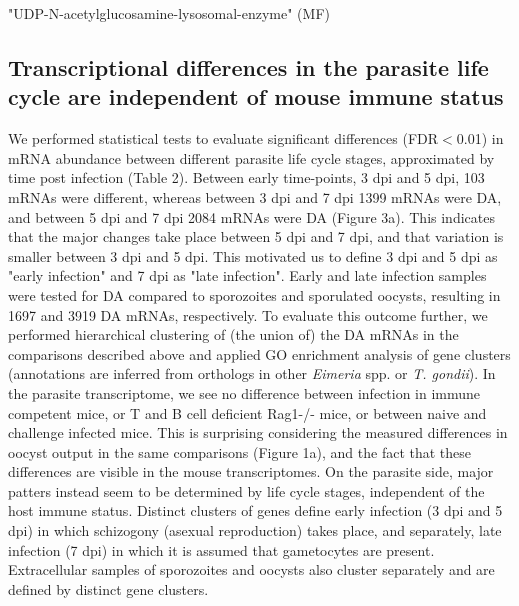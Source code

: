\documentclass{bmcart}
\begin{document}
 
"UDP-N-acetylglucosamine-lysosomal-enzyme" (MF)




\subsection*{Transcriptional differences in the parasite life cycle are independent of mouse immune status}
We performed statistical tests to evaluate significant differences (FDR$<$0.01) in mRNA abundance between different parasite life cycle stages, approximated by time post infection (Table 2). Between early time-points, 3 dpi and 5 dpi, 103 mRNAs were different, whereas between 3 dpi and 7 dpi 1399 mRNAs were DA, and between 5 dpi and 7 dpi 2084 mRNAs were DA (Figure 3a). This indicates that the major changes take place between 5 dpi and 7 dpi, and that variation is smaller between 3 dpi and 5 dpi. This motivated us to define 3 dpi and 5 dpi as "early infection" and 7 dpi as "late infection". Early and late infection samples were tested for DA compared to sporozoites and sporulated oocysts, resulting in 1697 and 3919 DA mRNAs, respectively.
To evaluate this outcome further, we performed hierarchical clustering of (the union of) the DA mRNAs in the comparisons described above and applied GO enrichment analysis of gene clusters (annotations are inferred from orthologs in other \textit{Eimeria} spp. or \textit{T. gondii}). In the parasite transcriptome, we see no difference between infection in immune competent mice, or T and B cell deficient Rag1-/- mice, or between naive and challenge infected mice. This is surprising considering the measured differences in oocyst output in the same comparisons (Figure 1a), and the fact that these differences are visible in the mouse transcriptomes. On the parasite side, major patters instead seem to be determined by life cycle stages, independent of the host immune status. Distinct clusters of genes define early infection (3 dpi and 5 dpi) in which schizogony (asexual reproduction) takes place, and separately, late infection (7 dpi) in which it is assumed that gametocytes are present. Extracellular samples of sporozoites and oocysts also cluster separately and are defined by distinct gene clusters. 
\end{document}

